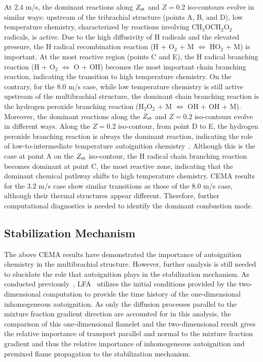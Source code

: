 \documentclass[review,3p,times]{elsarticle}
\begin{document}
At $2.4$ m/s, the dominant reactions along $Z_{\rm st}$ and $Z = 0.2$ iso-contours evolve in similar ways: upstream of the tribrachial structure (points A, B, and D), low temperature chemistry, characterized by reactions involving CH$_3$OCH$_2$O$_2$ radicals, is active.  Due to the high diffusivity of H radicals and the elevated pressure, the H radical recombination reaction (H + O$_2$ + M $\Longleftrightarrow$ HO$_2$ + M) is important.  At the most reactive region (points C and E), the H radical branching reaction (H + O$_2$ $\Longleftrightarrow$ O + OH) becomes the most important chain branching reaction, indicating the transition to high temperature chemistry.  On the contrary, for the $8.0$ m/s case, while low temperature chemistry is still active upstream of the multibrachial structure, the dominant chain branching reaction is the hydrogen peroxide branching reaction (H$_2$O$_2$ + M $\Longleftrightarrow$ OH + OH + M).  Moreover, the dominant reactions along the $Z_{\rm st}$ and $Z = 0.2$ iso-contours evolve in different ways.  Along the $Z = 0.2$ iso-contour, from point D to E, the hydrogen peroxide branching reaction is always the dominant reaction, indicating the role of low-to-intermediate temperature autoignition chemistry~\cite{westbrook00}.  Although this is the case at point A on the $Z_{\rm st}$ iso-contour, the H radical chain branching reaction becomes dominant at point C, the most reactive zone, indicating that the dominant chemical pathway shifts to high temperature chemistry.  CEMA results for the $3.2$ m/s case show similar transitions as those of the $8.0$ m/s case, although their thermal structures appear different.  Therefore, further computational diagnostics is needed to identify the dominant combustion mode.   

\subsection{Stabilization Mechanism} 
The above CEMA results have demonstrated the importance of autoignition chemistry in the multibrachial structure.  However, further analysis is still needed to elucidate the role that autoignition plays in the stabilization mechanism.  As conducted previously~\cite{deng15}, LFA~\cite{pitsch98a} utilizes the initial conditions provided by the two-dimensional computation to provide the time history of the one-dimensional inhomogeneous autoignition.  As only the diffusion processes parallel to the mixture fraction gradient direction are accounted for in this analysis, the comparison of this one-dimensional flamelet and the two-dimensional result gives the relative importance of transport parallel and normal to the mixture fraction gradient and thus the relative importance of inhomogeneous autoignition and premixed flame propagation to the stabilization mechanism.
\end{document}
